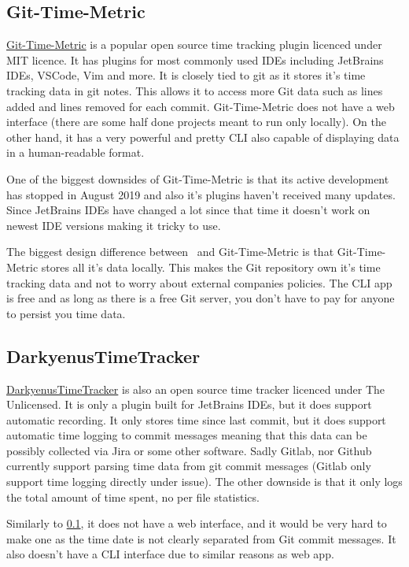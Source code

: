 \subsection{Git-Time-Metric}\label{subsec:git-time-metric}
\href{https://github.com/git-time-metric/gtm}{Git-Time-Metric} is a popular open source time tracking plugin licenced under MIT licence.
It has plugins for most commonly used IDEs including JetBrains IDEs, VSCode, Vim and more.
It is closely tied to git as it stores it's time tracking data in git notes.
This allows it to access more Git data such as lines added and lines removed for each commit.
Git-Time-Metric does not have a web interface (there are some half done projects meant to run only locally).
On the other hand, it has a very powerful and pretty CLI also capable of displaying data in a human-readable format.

One of the biggest downsides of Git-Time-Metric is that its active development has stopped in August 2019 and also it's plugins haven't received many updates.
Since JetBrains IDEs have changed a lot since that time it doesn't work on newest IDE versions making it tricky to use.

The biggest design difference between~ and Git-Time-Metric is that Git-Time-Metric stores all it's data locally.
This makes the Git repository own it's time tracking data and not to worry about external companies policies.
The CLI app is free and as long as there is a free Git server, you don't have to pay for anyone to persist you time data.


\subsection{DarkyenusTimeTracker}\label{subsec:darkyenus-time-tracker}
\href{https://github.com/Darkyenus/DarkyenusTimeTracker}{DarkyenusTimeTracker} is also an open source time tracker licenced under The Unlicensed.
It is only a plugin built for JetBrains IDEs, but it does support automatic recording.
It only stores time since last commit, but it does support automatic time logging to commit messages meaning that this data can be possibly collected via Jira or some other software.
Sadly Gitlab, nor Github currently support parsing time data from git commit messages (Gitlab only support time logging directly under issue).
The other downside is that it only logs the total amount of time spent, no per file statistics.

Similarly to
\ref{subsec:git-time-metric}, it does not have a web interface, and it would be very hard to make one as the time date is not clearly separated from Git commit messages.
It also doesn't have a CLI interface due to similar reasons as web app.



